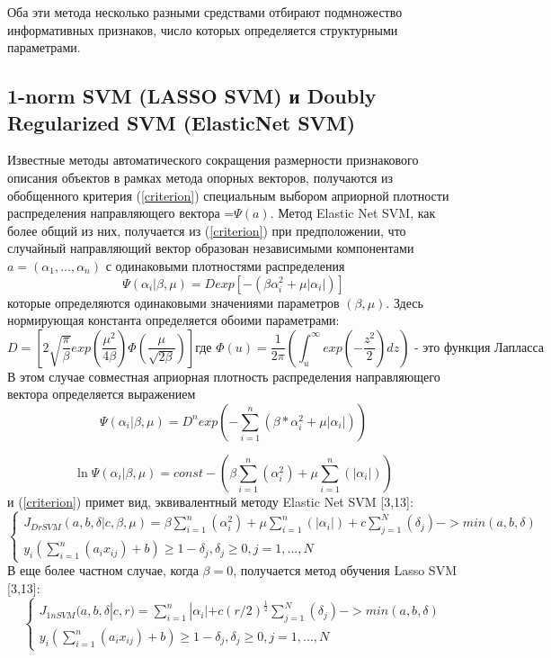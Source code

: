 \documentclass[../body.tex]{subfiles}
\begin{document}
\vspace{\baselineskip}
Оба эти метода несколько разными средствами отбирают подмножество информативных признаков, число которых определяется структурными параметрами.
\subsection{1-norm SVM (LASSO SVM) и Doubly Regularized SVM (ElasticNet SVM)}

Известные методы автоматического сокращения размерности признакового описания объектов в рамках метода опорных векторов,  получаются из обобщенного критерия (\ref{criterion}) специальным выбором априорной плотности распределения направляющего вектора =$\varPsi(a)$. Метод Elastic Net SVM, как более общий из них, получается из (\ref{criterion})  при предположении, что случайный направляющий вектор образован независимыми компонентами $a=(\alpha_1, ..., \alpha_n)$
с одинаковыми плотностями распределения 
\[\varPsi(\alpha_i|\beta,\mu)= Dexp[-(\beta\alpha_i^2+\mu|\alpha_i|)]\]
которые определяются одинаковыми значениями параметров $(\beta, \mu)$. Здесь нормирующая константа определяется обоими параметрами:
$$D=[2\sqrt{\frac{\pi}{\beta}}exp(\frac{\mu^2}{4\beta})\Phi(\dfrac{\mu}{\sqrt{2\beta}})]\mbox{где }\Phi(u)=\frac{1}{2\pi}(\int_{u}^{\infty}exp(-\frac{z^2}{2})dz)\mbox{ - это функция Лапласса}$$
В этом случае совместная априорная плотность распределения направляющего вектора определяется выражением $$\varPsi(\alpha_i|\beta,\mu)=D^{n}exp(-\sum_{i=1}^{n}(\beta*\alpha^{2}_{i}+\mu|\alpha_{i}|))$$

$$
\ln\varPsi(\alpha_i|\beta,\mu) = const - (\beta\sum_{i=1}^{n}(\alpha_i^2)+\mu\sum_{i=1}^{n}(|\alpha_i|))
$$
 и (\ref{criterion}) примет вид, эквивалентный методу Elastic Net SVM [3,13]: 
$$\left\{\begin{matrix}
J_{DrSVM}(a, b, \delta |c,\beta ,\mu ) = \beta\sum_{i=1}^{n}(\alpha_i^2)+\mu\sum_{i=1}^{n}(|\alpha_i|) + c\sum_{j=1}^{N}(\delta_j)->min(a,b,\delta)
	\\
	y_i(\sum_{i=1}^{n}(a_ix_{ij})+b)\geq1-\delta_j, \delta_j \geq 0, j= 1,...,N
\end{matrix}\right.$$
В еще более частном случае, когда $\beta = 0$, получается метод обучения Lasso SVM [3,13]:
$$\left\{\begin{matrix}
	J_{1nSVM}(a, b, \delta |c,r ) = \sum_{i=1}^{n}|\alpha_i| + c(r/2)^{\frac{1}{2}}\sum_{j=1}^{N}(\delta_j)->min(a,b,\delta)
	\\
	y_i(\sum_{i=1}^{n}(a_ix_{ij})+b)\geq1-\delta_j, \delta_j \geq 0, j= 1,...,N
\end{matrix}\right.$$
\end{document}
